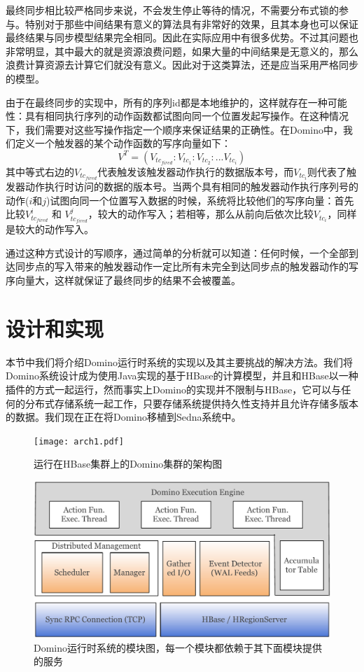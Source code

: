 最终同步相比较严格同步来说，不会发生停止等待的情况，不需要分布式锁的参与。特别对于那些中间结果有意义的算法具有非常好的效果，且其本身也可以保证最终结果与同步模型结果完全相同。因此在实际应用中有很多优势。不过其问题也非常明显，其中最大的就是资源浪费问题，如果大量的中间结果是无意义的，那么浪费计算资源去计算它们就没有意义。因此对于这类算法，还是应当采用严格同步的模型。

由于在最终同步的实现中，所有的序列id都是本地维护的，这样就存在一种可能性：具有相同执行序列的动作函数都试图向同一个位置发起写操作。在这种情况下，我们需要对这些写操作指定一个顺序来保证结果的正确性。在Domino中，我们定义一个触发器的某个动作函数的写序向量如下：
\begin{equation}
V^{T} = (V_{tc_{fired}}: V_{tc_1} : V_{tc_2}: ... V_{tc_i})
\end{equation}
其中等式右边的$V_{tc_{fired}}$代表触发该触发器动作执行的数据版本号，而$V_{tc_i}$则代表了触发器动作执行时访问的数据的版本号。当两个具有相同的触发器动作执行序列号的动作($i$和$j$)试图向同一个位置写入数据的时候，系统将比较他们的写序向量：首先比较$V_{tc_{fired}}^i$ 和 $V_{tc_{fired}}^j$，较大的动作写入；若相等，那么从前向后依次比较$V_{tc_i}$，同样是较大的动作写入。

通过这种方式设计的写顺序，通过简单的分析就可以知道：任何时候，一个全部到达同步点的写入带来的触发器动作一定比所有未完全到达同步点的触发器动作的写序向量大，这样就保证了最终同步的结果不会被覆盖。

\section{设计和实现}
\label{section:design}
本节中我们将介绍Domino运行时系统的实现以及其主要挑战的解决方法。我们将Domino系统设计成为使用Java实现的基于HBase的计算模型，并且和HBase以一种插件的方式一起运行，然而事实上Domino的实现并不限制与HBase，它可以与任何的分布式存储系统一起工作，只要存储系统提供持久性支持并且允许存储多版本的数据。我们现在正在将Domino移植到Sedna系统中。


\begin{figure}[h!]
\centering
\texttt{[image: arch1.pdf]}
\caption{运行在HBase集群上的Domino集群的架构图}
\label{fig:arch1}
\end{figure}

\begin{figure}[h!]
\centering
\includegraphics[width=5in]{../figures/arch.pdf}
\caption{Domino运行时系统的模块图，每一个模块都依赖于其下面模块提供的服务}
\label{fig:arch}
\end{figure}

